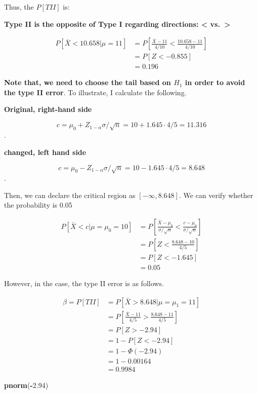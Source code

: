 \documentclass[]{book}
\newenvironment{Shaded}{\begin{snugshade}}{\end{snugshade}}
\newcommand{\FloatTok}[1]{\textcolor[rgb]{0.00,0.00,0.81}{#1}}
\newcommand{\KeywordTok}[1]{\textcolor[rgb]{0.13,0.29,0.53}{\textbf{#1}}}
\newcommand{\NormalTok}[1]{#1}
\newcommand{\OperatorTok}[1]{\textcolor[rgb]{0.81,0.36,0.00}{\textbf{#1}}}
\begin{document}
Thus, the \(P[TII]\) is:

\textbf{Type II is the opposite of Type I regarding directions: \textless{} vs.~\textgreater{}}

\[\begin{aligned} P[\bar{X} <10.658 | \mu=11]&=P[\frac{\bar{X}-11}{4/10} < \frac{10.658-11}{4/10}] \\ &=P[Z< -0.855] \\ &=0.196\end{aligned}\]

\textbf{Note that, we need to choose the tail based on \(H_1\) in order to avoid the type II error}. To illustrate, I calculate the following.

\textbf{Original, right-hand side}

\[c=\mu_0+Z_{1-\alpha}\sigma/\sqrt{n}=10+1.645 \cdot 4/5=11.316\].

\textbf{changed, left hand side}

\[c=\mu_0-Z_{1-\alpha}\sigma/\sqrt{n}=10-1.645 \cdot 4/5=8.648\].

Then, we can declare the critical region as \([-\infty, 8.648]\). We can verify whether the probability is 0.05

\[\begin{aligned} P[\bar{X} < c | \mu=\mu_0=10] &=P[\frac{\bar{X}-\mu_0}{\sigma/\sqrt{n}} < \frac{c-\mu_0}{\sigma/\sqrt{n}}] \\ &=P[Z < \frac{8.648-10}{4/5}] \\&=P[Z< -1.645] \\&=0.05 \end{aligned}\]

However, in the case, the type II error is as follows.

\[\begin{aligned} \beta=P[TII] &=P[\bar{X}>8.648 |\mu=\mu_1=11] \\ &=P[\frac{\bar{X}-11}{4/5}>\frac{8.648-11}{4/5}] \\ &=P[Z > -2.94] \\ &=1-P[Z<-2.94] \\ &=1-\Phi(-2.94) \\ &=1-0.00164 \\&=0.9984 \end{aligned}\]

\begin{Shaded}
\begin{Highlighting}[]
\KeywordTok{pnorm}\NormalTok{(}\OperatorTok{-}\FloatTok{2.94}\NormalTok{)}
\end{Highlighting}
\end{Shaded}
\end{document}
